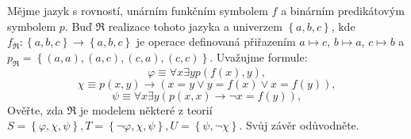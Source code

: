 Mějme jazyk s rovností, unárním funkčním symbolem $f$ a binárním predikátovým
symbolem $p$. Buď $\Re$ realizace tohoto jazyka a univerzem $\left \{ a,b,c
\right \}$, kde $f_{\Re }:\left \{ a,b,c \right \}\rightarrow \left \{ a,b,c
\right \}$ je operace definovaná přiřazením $a \mapsto c$, $b \mapsto a$, $c
\mapsto b$ a $p_{\Re }=\left \{ (a,a),(a,c),(c,a),(c,c) \right \}$. Uvažujme
formule:
$$\varphi \equiv \forall x\exists yp(f(x),y),$$
$$\chi \equiv p(x,y)\rightarrow (x=y\vee y=f(x)\vee x=f(y)),$$
$$\psi \equiv \forall x\exists y (p(x,x) \rightarrow \neg x = f(y)),$$
Ověřte, zda $\Re$ je modelem některé z teorií $S=\left \{ \varphi ,\chi ,\psi
\right \},T=\left \{ \neg\varphi ,\chi ,\psi  \right \}, U=\left \{ \psi
,\neg\chi  \right \}$. Svůj závěr odůvodněte.
